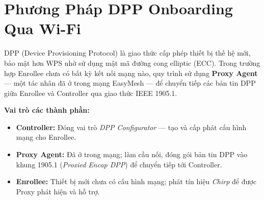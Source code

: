 \section{Phương Pháp DPP Onboarding Qua Wi-Fi}

DPP (Device Provisioning Protocol) là giao thức cấp phép thiết bị thế hệ mới, bảo mật hơn
WPS nhờ sử dụng mật mã đường cong elliptic (ECC). Trong trường hợp Enrollee chưa có bất
kỳ kết nối mạng nào, quy trình sử dụng \textbf{Proxy Agent} --- một tác nhân đã ở trong
mạng EasyMesh --- để chuyển tiếp các bản tin DPP giữa Enrollee và Controller qua giao
thức IEEE 1905.1.

\textbf{Vai trò các thành phần:}
\begin{itemize}
	\item \textbf{Controller:} Đóng vai trò \textit{DPP Configurator} --- tạo và cấp phát
	cấu hình mạng cho Enrollee.
	\item \textbf{Proxy Agent:} Đã ở trong mạng; làm cầu nối, đóng gói bản tin DPP vào
	khung 1905.1 (\textit{Proxied Encap DPP}) để chuyển tiếp tới Controller.
	\item \textbf{Enrollee:} Thiết bị mới chưa có cấu hình mạng; phát tín hiệu
	\textit{Chirp} để được Proxy phát hiện và hỗ trợ.
\end{itemize}

